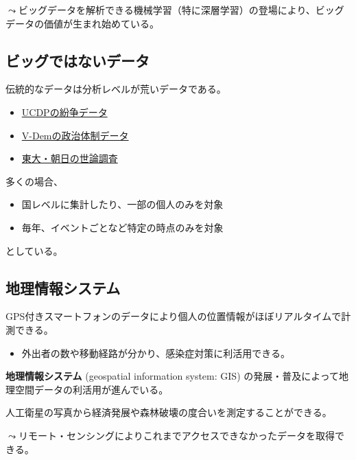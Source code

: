 \documentclass[
  xelatex,
  ja=standard]{bxjsarticle}
\providecommand{\tightlist}{%
  \setlength{\itemsep}{0pt}\setlength{\parskip}{0pt}}\usepackage{longtable,booktabs,array}
\begin{document}
\(\leadsto\)ビッグデータを解析できる機械学習（特に深層学習）の登場により、ビッグデータの価値が生まれ始めている。

\hypertarget{ux30d3ux30c3ux30b0ux3067ux306fux306aux3044ux30c7ux30fcux30bf}{%
\subsection{ビッグではないデータ}\label{ux30d3ux30c3ux30b0ux3067ux306fux306aux3044ux30c7ux30fcux30bf}}

伝統的なデータは分析レベルが荒いデータである。

\begin{itemize}
\tightlist
\item
  \href{https://ucdp.uu.se/encyclopedia}{UCDPの紛争データ}
\item
  \href{https://www.v-dem.net/}{V-Demの政治体制データ}
\item
  \href{http://www.masaki.j.u-tokyo.ac.jp/utas/utasindex.html}{東大・朝日の世論調査}
\end{itemize}

多くの場合、

\begin{itemize}
\tightlist
\item
  国レベルに集計したり、一部の個人のみを対象
\item
  毎年、イベントごとなど特定の時点のみを対象
\end{itemize}

としている。

\hypertarget{ux5730ux7406ux60c5ux5831ux30b7ux30b9ux30c6ux30e0}{%
\subsection{地理情報システム}\label{ux5730ux7406ux60c5ux5831ux30b7ux30b9ux30c6ux30e0}}

GPS付きスマートフォンのデータにより個人の位置情報がほぼリアルタイムで計測できる。

\begin{itemize}
\tightlist
\item
  外出者の数や移動経路が分かり、感染症対策に利活用できる。
\end{itemize}

\textbf{地理情報システム} (geospatial information system: GIS)
の発展・普及によって地理空間データの利活用が進んでいる。

人工衛星の写真から経済発展や森林破壊の度合いを測定することができる。

\(\leadsto\)リモート・センシングによりこれまでアクセスできなかったデータを取得できる。
\end{document}
